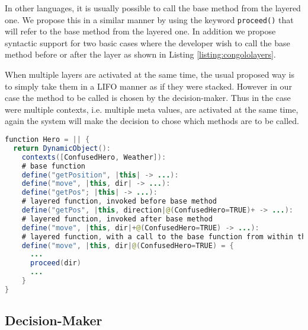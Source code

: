 \documentclass{sig-alternate}
\begin{document}
In other languages, it is usually possible to call the base method from the layered one. We propose this in a similar manner by using the keyword \lstinline|proceed()| that will refer to the base method from the layered one. In addition we propose syntactic support for two basic cases where the developer wish to call the base method before or after the layer as shown in Listing \ref{listing:congololayers}.

When multiple layers are activated at the same time, the usual proposed way is to simply take them in a LIFO manner as if they were stacked. However in our case the method to be called is chosen by the decision-maker. Thus in the case were multiple contexts, i.e. multiple meta values, are activated at the same time, again the system will make the decision to chose which methods are to be called.

\begin{lstlisting}[float, language=Java, caption=Congolo layers example, label={listing:congololayers}]
function Hero = || {
  return DynamicObject():
    contexts([ConfusedHero, Weather]):
    # base function
    define("getPosition", |this| -> ...):
    define("move", |this, dir| -> ...):
    define("getPos"; |this| -> ...):
    # layered function, invoked before base method
    define("getPos", |this, direction|@(ConfusedHero=TRUE)+ -> ...):
    # layered function, invoked after base method
    define("move", |this, dir|+@(ConfusedHero=TRUE) -> ...):
    # layered function, with a call to the base function from within the layer
    define("move", |this, dir|@(ConfusedHero=TRUE) = {
      ...
      proceed(dir)
      ...
    }
}
\end{lstlisting}

\subsection{Decision-Maker}
\end{document}
